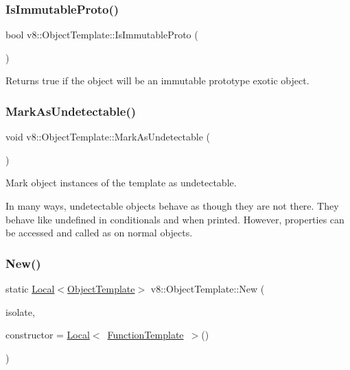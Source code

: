 \subsubsection{\texorpdfstring{Is\+Immutable\+Proto()}{IsImmutableProto()}}
{\footnotesize\ttfamily bool v8\+::\+Object\+Template\+::\+Is\+Immutable\+Proto (\begin{DoxyParamCaption}{ }\end{DoxyParamCaption})}

Returns true if the object will be an immutable prototype exotic object. \mbox{\label{classv8_1_1ObjectTemplate_a7e40ef313b44c2ad336c73051523b4f8}} 
\subsubsection{\texorpdfstring{Mark\+As\+Undetectable()}{MarkAsUndetectable()}}
{\footnotesize\ttfamily void v8\+::\+Object\+Template\+::\+Mark\+As\+Undetectable (\begin{DoxyParamCaption}{ }\end{DoxyParamCaption})}

Mark object instances of the template as undetectable.

In many ways, undetectable objects behave as though they are not there. They behave like \textquotesingle{}undefined\textquotesingle{} in conditionals and when printed. However, properties can be accessed and called as on normal objects. \mbox{\label{classv8_1_1ObjectTemplate_ae0bcd58e9e069c50148c377d774de7a1}} 
\subsubsection{\texorpdfstring{New()}{New()}}
{\footnotesize\ttfamily static \mbox{\hyperlink{classv8_1_1Local}{Local}}$<$\mbox{\hyperlink{classv8_1_1ObjectTemplate}{Object\+Template}}$>$ v8\+::\+Object\+Template\+::\+New (\begin{DoxyParamCaption}\item[{Isolate $\ast$}]{isolate,  }\item[{\mbox{\hyperlink{classv8_1_1Local}{Local}}$<$ \mbox{\hyperlink{classv8_1_1FunctionTemplate}{Function\+Template}} $>$}]{constructor = {\ttfamily \mbox{\hyperlink{classv8_1_1Local}{Local}}$<$~\mbox{\hyperlink{classv8_1_1FunctionTemplate}{Function\+Template}}~$>$()} }\end{DoxyParamCaption})\hspace{0.3cm}{\ttfamily [static]}}


